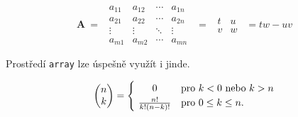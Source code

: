 \documentclass[a4paper, 11pt, twocolumn]{article}
\theoremstyle{definition}
\begin{document}
  \begin{equation*}
    \textbf{A}
    \ = \
    \begin{array}{||cccc||}
      \ a_{11} & a_{12} & \cdots & a_{1n}\ \\
      \ a_{21} & a_{22} & \cdots & a_{2n}\ \\
      \ \vdots & \vdots & \ddots & \vdots\ \\
      \ a_{m1} & a_{m2} & \cdots & a_{mn}\
    \end{array}
    \ = \
    \begin{array}{|cc|}
      \ t & u \ \\
      \ v & w \
    \end{array}\ =tw \minus uv
  \end{equation*}

  Prostředí \texttt{array} lze úspešně využít i jinde.

    \begin{equation*}
      \begin{pmatrix}
          n \\
          k 
      \end{pmatrix}
      =
      \begin{cases}
        \ \hfil 0 & \text{pro } k < 0 \text{ nebo } k > n \\
        \ \frac{n!}{k!(n-k)!} & \text{pro } 0\leq k\leq n\text{.} 
      \end{cases}
    \end{equation*}
\end{document}
